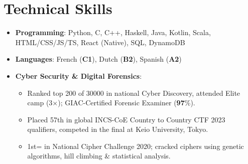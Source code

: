 \documentclass{Resume}
\begin{document}
    \section{Technical Skills}
        {\small \begin{itemize}[label=--]
            \item \textbf{Programming}: Python, C, C++, Haskell, Java, Kotlin, Scala, HTML/CSS/JS/TS, React (Native), SQL, DynamoDB
            \item \textbf{Languages}: French (\textbf{C1}), Dutch (\textbf{B2}), Spanish (\textbf{A2})
            \item \textbf{Cyber Security \& Digital Forensics}: \begin{itemize}
                \item Ranked top 200 of 30000 in national Cyber Discovery, attended Elite camp (3×); GIAC-Certified Forensic Examiner (\textbf{97}\%).
                \item Placed 57th in global INCS-CoE Country to Country CTF 2023 qualifiers, competed in the final at Keio University, Tokyo.
                \item 1st= in National Cipher Challenge 2020; cracked ciphers using genetic algorithms, hill climbing \& statistical analysis.
            \end{itemize}
        \end{itemize}
        }        
\end{document}
